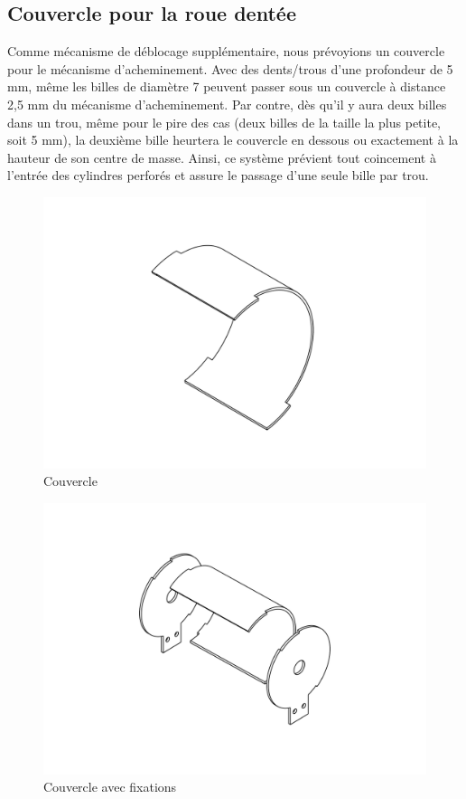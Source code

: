 \subsection{Couvercle pour la roue dentée}
Comme mécanisme de déblocage supplémentaire, nous prévoyions un couvercle pour le mécanisme d'acheminement. Avec des dents/trous d'une profondeur de 5 mm, même les billes de diamètre 7 peuvent passer sous un couvercle à distance 2,5 mm du mécanisme d'acheminement. Par contre, dès qu'il y aura deux billes dans un trou, même pour le pire des cas (deux billes de la taille la plus petite, soit 5 mm), la deuxième bille heurtera le couvercle en dessous ou exactement à la hauteur de son centre de masse. Ainsi, ce système prévient tout coincement à l'entrée des cylindres perforés et assure le passage d'une seule bille par trou.

\begin{figure}
    \centering
    \includegraphics[width=\textwidth]{Graphics/Roue/DRAWING_COUVERCLE.pdf}
    \caption{Couvercle}
\end{figure}

\begin{figure}
    \centering
    \includegraphics[width=\textwidth]{Graphics/Roue/DRAWING_COUVERCLE_DEMI_COMPLET.pdf}
    \caption{Couvercle avec fixations}
\end{figure}

